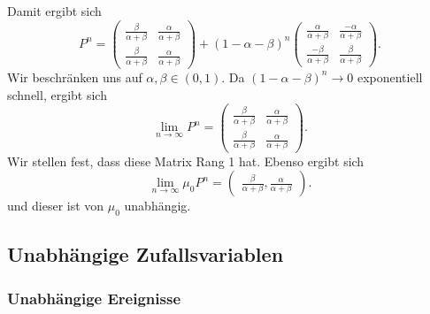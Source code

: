 \begin{example}
\begin{enumerate}[label=\protect\circled{\alph*}]
            Damit ergibt sich
            \[
                P^n = \begin{pmatrix} \frac{β}{α+β} & \frac{α}{α+β} \\ \frac{β}{α+β} & \frac{α}{α+β} \end{pmatrix}  + (1-α-β)^n \begin{pmatrix} \frac{α}{α+β} & \frac{-α }{\alpha + \beta} \\ \frac{-\beta }{\alpha + \beta} & \frac{\beta}{\alpha + \beta} \end{pmatrix} 
            .\] 
            Wir beschränken uns auf $α,β \in (0,1)$. Da $(1-α-β)^n \to 0$ exponentiell schnell, ergibt sich
            \[
            \lim_{n \to \infty} P^n = \begin{pmatrix} \frac{β}{α+β} & \frac{α}{α+β} \\ \frac{β}{α+β} & \frac{α}{α+β} \end{pmatrix} 
            .\] 
            Wir stellen fest, dass diese Matrix Rang 1 hat. Ebenso ergibt sich
\[
\lim_{n \to \infty} \mu_0 P^n = \begin{pmatrix} \frac{β}{α+β}, \frac{α}{α+β} \end{pmatrix} 
.\] 
und dieser ist von $μ_0$ unabhängig.
    \end{enumerate}
\end{example}
\subsection{Unabhängige Zufallsvariablen}
\subsubsection{Unabhängige Ereignisse}

